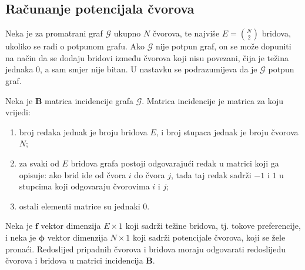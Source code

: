 \documentclass[lmodern, utf8, diplomski, numeric]{fer}
\newcommand{\matr}[1]{\mathbold{#1}}
\newcommand{\graph}[1]{\mathcal{#1}}
\begin{document}
  \subsection{Računanje potencijala čvorova}
  \label{sub:potential}
  Neka je za promatrani graf $\graph{G}$ ukupno $N$ čvorova, te najviše $E = \binom{N}{2}$ bridova, ukoliko se radi o potpunom grafu.
  Ako $\graph{G}$ nije potpun graf, on se može dopuniti na način da se dodaju bridovi između čvorova koji nisu povezani, čija je težina jednaka 0, a sam smjer nije bitan.
  U nastavku se podrazumijeva da je $\graph{G}$ potpun graf.
  
  Neka je $\matr{B}$ matrica incidencije grafa $\graph{G}$.
  Matrica incidencije je matrica za koju vrijedi:
  \begin{enumerate}
    \item broj redaka jednak je broju bridova $E$, i broj stupaca jednak je broju čvorova $N$;
    \item za svaki od $E$ bridova grafa postoji odgovarajući redak u matrici koji ga opisuje: ako brid ide od čvora $i$ do čvora $j$, tada taj redak sadrži $-1$ i $1$ u stupcima koji odgovaraju čvorovima $i$ i $j$;
    \item ostali elementi matrice su jednaki 0.
  \end{enumerate}
  Neka je $\matr{f}$ vektor dimenzija $E \times 1$ koji sadrži težine bridova, tj. tokove preferencije,
  i neka je $\matr{\phi}$ vektor dimenzija $N \times 1$ koji sadrži potencijale čvorova, koji se žele pronaći.
  Redoslijed pripadnih čvorova i bridova moraju odgovarati redoslijedu čvorova i bridova u matrici incidencija $\matr{B}$.
  
\end{document}
